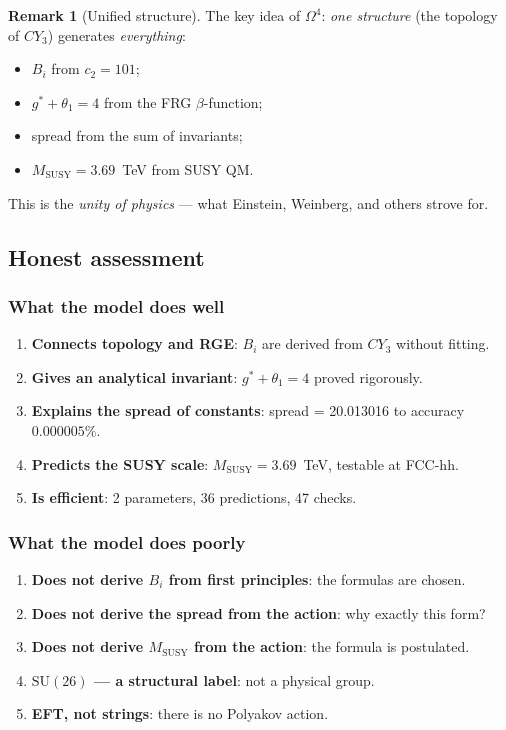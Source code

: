 \documentclass[11pt,a4paper]{article}
\newcommand{\SU}{\ensuremath{\mathrm{SU}}}
\newcommand{\CY}{\ensuremath{CY_3}}
\newcommand{\Om}{\ensuremath{\Omega^4}}
\theoremstyle{definition}
\newtheorem{remark}[theorem]{Remark}
\begin{document}
\begin{remark}[Unified structure]
\label{rem:unity}
The key idea of $\Om$: \emph{one structure} (the topology of $\CY$)
generates \emph{everything}:
\begin{itemize}
    \item $B_i$ from $c_2 = 101$;
    \item $g^* + \theta_1 = 4$ from the FRG $\beta$-function;
    \item spread from the sum of invariants;
    \item $M_{\text{SUSY}} = 3.69$~TeV from SUSY QM.
\end{itemize}
This is the \emph{unity of physics} --- what Einstein, Weinberg, and others
strove for.
\end{remark}

\subsection{Honest assessment}
\label{subsec:disc-honest}

\subsubsection{What the model does well}

\begin{enumerate}
    \item \textbf{Connects topology and RGE}: $B_i$ are derived
          from $\CY$ without fitting.
    \item \textbf{Gives an analytical invariant}:
          $g^* + \theta_1 = 4$ proved rigorously.
    \item \textbf{Explains the spread of constants}: spread = 20.013016
          to accuracy $0.000005\%$.
    \item \textbf{Predicts the SUSY scale}:
          $M_{\text{SUSY}} = 3.69$~TeV, testable at FCC-hh.
    \item \textbf{Is efficient}: 2 parameters, 36 predictions,
          47 checks.
\end{enumerate}

\subsubsection{What the model does poorly}

\begin{enumerate}
    \item \textbf{Does not derive $B_i$ from first principles}:
          the formulas are chosen.
    \item \textbf{Does not derive the spread from the action}:
          why exactly this form?
    \item \textbf{Does not derive $M_{\text{SUSY}}$ from the action}:
          the formula is postulated.
    \item \textbf{$\SU(26)$ --- a structural label}:
          not a physical group.
    \item \textbf{EFT, not strings}: there is no Polyakov action.
\end{enumerate}
\end{document}
